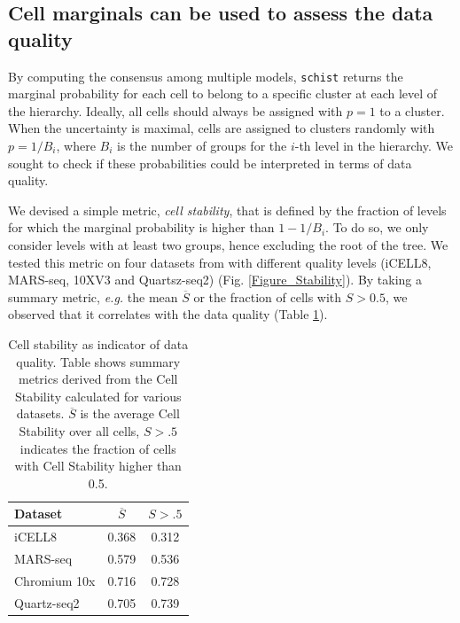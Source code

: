 \documentclass[10pt]{article}
\begin{document}
\subsection*{Cell marginals can be used to assess the data quality}

By computing the consensus among multiple models, \texttt{schist} returns the marginal probability for each cell to belong to a specific cluster at each level of the hierarchy. Ideally, all cells should always be assigned with $p=1$ to a cluster. When the uncertainty is maximal, cells are assigned to clusters randomly with $p=1/B_i$, where $B_i$ is the number of groups for the $i$-th level in the hierarchy. We sought to check if these probabilities could be interpreted in terms of data quality. 

We devised a simple metric, \emph{cell stability}, that is defined by the fraction of levels for which the marginal probability is higher than $1-1/B_i$. To do so, we only consider levels with at least two groups, hence excluding the root of the tree. We tested this metric on four datasets from \cite{mereu_2020} with different quality levels (iCELL8, MARS-seq, 10XV3 and Quartsz-seq2) (Fig. \ref{Figure_Stability}). By taking a summary metric, \emph{e.g.} the mean $\overline{S}$ or the fraction of cells with $S>0.5$, we observed that it correlates with the data quality (Table \ref{table_stability}).

\begin{table}[h!]
\centering
 \begin{tabular}{|| l c c ||}
 \hline
 \textbf{Dataset} & \textbf{$\overline{S}$} & \textbf{$S > .5$} \\ [0.5ex] 

 \hline\hline
 iCELL8 \cite{mereu_2020} & 0.368 & 0.312  \\
 \hline
 MARS-seq \cite{mereu_2020} & 0.579 & 0.536  \\
 \hline
 Chromium 10x \cite{mereu_2020} & 0.716 & 0.728  \\
 \hline
 Quartz-seq2 \cite{mereu_2020} & 0.705 & 0.739 \\
 \hline
\end{tabular}
\caption{Cell stability as indicator of data quality. Table shows summary metrics derived from the Cell Stability calculated for various datasets. $\overline{S}$ is the average Cell Stability over all cells, $S>.5$ indicates the fraction of cells with Cell Stability higher than 0.5.}
\label{table_stability}
\end{table}
\end{document}
